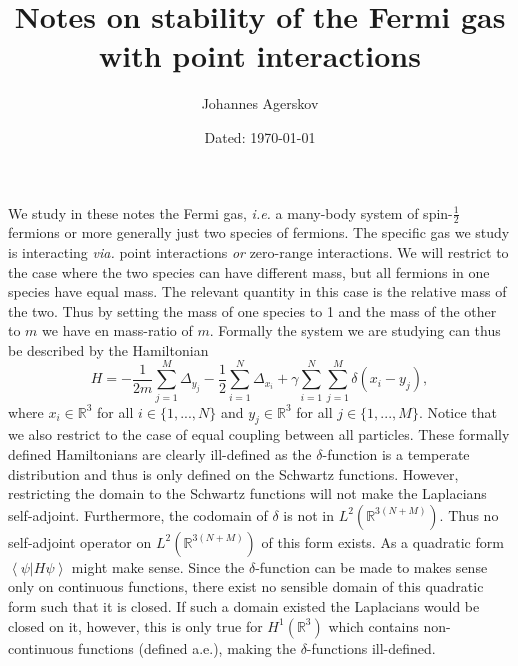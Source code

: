 \documentclass[a4paper,11pt]{article}
\author{Johannes Agerskov}
\date{Dated: \today}
\title{Notes on stability of the Fermi gas with point interactions}
\renewcommand{\braket}[1]{\left\langle#1\right\rangle}
\newcommand{\ie}{\emph{i.e.} }
\newcommand{\R}{\mathbb{R}}
\numberwithin{equation}{section}
\begin{document}
	\maketitle
	\tableofcontents
\vspace{1cm}
We study in these notes the Fermi gas, \ie a many-body system of spin-$ \frac{1}{2} $ fermions or more generally just two species of fermions. The specific gas we study is interacting \emph{via.} point interactions \emph{or} zero-range interactions. We will restrict to the case where the two species can have different mass, but all fermions in one species have equal mass. The relevant quantity in this case is the relative mass of the two. Thus by setting the mass of one species to 1 and the mass of the other to $ m $ we have en mass-ratio of $ m $. Formally the system we are studying can thus be described by the Hamiltonian \begin{equation}\label{Formal Hamiltonian}
H=-\frac{1}{2m}\sum_{j=1}^{M}\Delta_{y_j}-\frac{1}{2}\sum_{i=1}^{N}\Delta_{x_i}+\gamma\sum_{i=1}^{N}\sum_{j=1}^{M}\delta(x_i-y_j),
\end{equation}
where $ x_i\in\mathbb{R}^3 $ for all $ i\in\{1,...,N\} $ and $ y_j\in\mathbb{R}^3 $ for all $ j\in\{1,...,M\} $. Notice that we also restrict to the case of equal coupling between all particles. These formally defined Hamiltonians are clearly ill-defined as the $ \delta $-function is a  temperate distribution and thus is only defined on the Schwartz functions. However, restricting the domain to the Schwartz functions will not make the Laplacians self-adjoint. Furthermore, the codomain of $ \delta $ is not in $ L^2(\mathbb{R}^{3(N+M)}) $. Thus no self-adjoint operator on $ L^2(\R^{3(N+M)}) $ of this form exists.
As a quadratic form $ \braket{\psi|H\psi} $ might make sense. Since the $ \delta $-function can be made to makes sense only on continuous functions, there exist no sensible domain of this quadratic form such that it is closed. If such a domain existed the Laplacians would be closed on it, however, this is only true for $ H^1(\mathbb{R}^3) $ which contains non-continuous functions (defined a.e.), making the $ \delta $-functions ill-defined.
\end{document}
